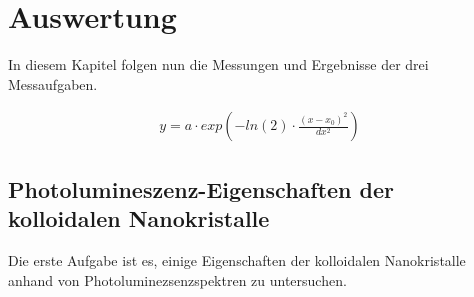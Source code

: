 \section{Auswertung}
In diesem Kapitel folgen nun die Messungen und Ergebnisse der drei Messaufgaben.

\begin{align}
	y = a \cdot exp \left( -ln(2) \cdot \frac{(x-x_0)^2}{dx^2} \right)
\label{form:gauss}
\end{align}



\subsection{Photolumineszenz-Eigenschaften der kolloidalen Nanokristalle}
Die erste Aufgabe ist es, einige Eigenschaften der kolloidalen Nanokristalle anhand von Photoluminezsenzspektren zu untersuchen.
